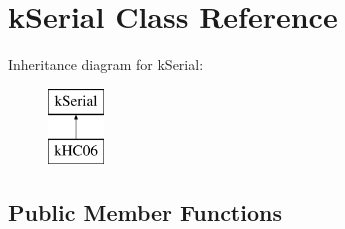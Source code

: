 \hypertarget{classkSerial}{}\section{k\+Serial Class Reference}
\label{classkSerial}
Inheritance diagram for k\+Serial\+:\begin{figure}[H]
\begin{center}
\leavevmode
\includegraphics[height=2.000000cm]{classkSerial}
\end{center}
\end{figure}
\subsection*{Public Member Functions}
